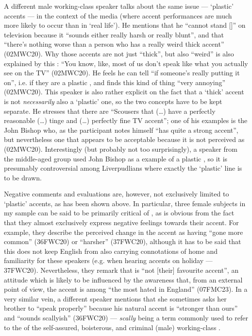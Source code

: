 A different male working-class speaker talks about the same issue --- `plastic'  accents --- in the context of the media (where  accent performances are much more likely to occur than in `real life').
He mentions that he ``cannot stand []'' on television because it ``sounds either really harsh or really blunt'', and that ``there's nothing worse than a person who has a really weird thick  accent'' (02MWC20).
Why those accents are not just ``thick'', but also ``weird'' is also explained by this : ``You know, like, most of us don't speak like what you actually see on the TV'' (02MWC20).
He feels he can tell ``if someone's really putting it on'', i.e. if they are a plastic , and finds this kind of thing ``very annoying'' (02MWC20).
This speaker is also rather explicit on the fact that a `thick' accent is not \emph{necessarily} also a `plastic' one, so the two concepts have to be kept separate.
He stresses that there are ``Scousers that (\ldots) have a perfectly reasonable (\ldots) tinge and (\ldots) perfectly fine TV accent''; one of his examples is the  John Bishop who, as the participant notes himself ``has quite a strong  accent'', but nevertheless one that appears to be acceptable because it is not perceived as  (02MWC20).
Interestingly (but probably not too surprisingly), a speaker from the middle-aged group used John Bishop as a  example of a plastic , so it is presumably controversial among Liverpudlians where exactly the `plastic' line is to be drawn.

Negative comments and evaluations are, however, not exclusively limited to `plastic' accents, as has been shown above.
In particular, three female subjects in my sample can be said to be primarily critical of , as is obvious from the fact that they almost exclusively express negative feelings towards their accent.
For example, they describe the perceived change in the accent as  having ``gone more common'' (36FWC20) or ``harsher'' (37FWC20), although it has to be said that this does not keep  English from also carrying connotations of home and familiarity for these speakers (e.g. when hearing  accents on holiday --- 37FWC20).
Nevertheless, they remark that  is ``not [their] favourite accent'', an attitude which is likely to be influenced by the awareness that, from an external point of view, the  accent is among ``the most hated in England'' (07FMC23).
In a very similar vein, a different speaker mentions that she sometimes asks her brother to ``speak properly'' because his natural accent is ``stronger than ours'' and ``sounds scallyish'' (36FWC20) --- \emph{scally} being a term commonly used to refer to the  of the self-assured, boisterous, and criminal (male) working-class .

